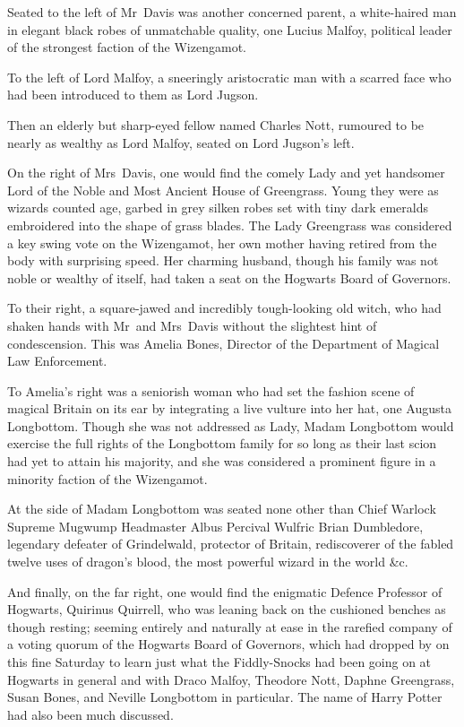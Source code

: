 Seated to the left of Mr~Davis was another concerned parent, a white-haired man in elegant black robes of unmatchable quality, one Lucius Malfoy, political leader of the strongest faction of the Wizengamot.

To the left of Lord Malfoy, a sneeringly aristocratic man with a scarred face who had been introduced to them as Lord Jugson.

Then an elderly but sharp-eyed fellow named Charles Nott, rumoured to be nearly as wealthy as Lord Malfoy, seated on Lord Jugson’s left.

On the right of Mrs~Davis, one would find the comely Lady and yet handsomer Lord of the Noble and Most Ancient House of Greengrass. Young they were as wizards counted age, garbed in grey silken robes set with tiny dark emeralds embroidered into the shape of grass blades. The Lady Greengrass was considered a key swing vote on the Wizengamot, her own mother having retired from the body with surprising speed. Her charming husband, though his family was not noble or wealthy of itself, had taken a seat on the Hogwarts Board of Governors.

To their right, a square-jawed and incredibly tough-looking old witch, who had shaken hands with Mr~and Mrs~Davis without the slightest hint of condescension. This was Amelia Bones, Director of the Department of Magical Law Enforcement.

To Amelia’s right was a seniorish woman who had set the fashion scene of magical Britain on its ear by integrating a live vulture into her hat, one Augusta Longbottom. Though she was not addressed as Lady, Madam Longbottom would exercise the full rights of the Longbottom family for so long as their last scion had yet to attain his majority, and she was considered a prominent figure in a minority faction of the Wizengamot.

At the side of Madam Longbottom was seated none other than Chief Warlock Supreme Mugwump Headmaster Albus Percival Wulfric Brian Dumbledore, legendary defeater of Grindelwald, protector of Britain, rediscoverer of the fabled twelve uses of dragon’s blood, the most powerful wizard in the world \&c.

And finally, on the far right, one would find the enigmatic Defence Professor of Hogwarts, Quirinus Quirrell, who was leaning back on the cushioned benches as though resting; seeming entirely and naturally at ease in the rarefied company of a voting quorum of the Hogwarts Board of Governors, which had dropped by on this fine Saturday to learn just what the Fiddly-Snocks had been going on at Hogwarts in general and with Draco Malfoy, Theodore Nott, Daphne Greengrass, Susan Bones, and Neville Longbottom in particular. The name of Harry Potter had also been much discussed.

